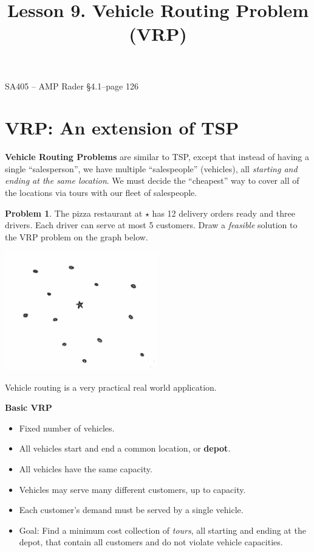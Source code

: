 \documentclass[11pt]{article}
\makeatletter
\theoremstyle{definition}
\newtheorem{problem}{Problem}
\renewcommand{\maketitle}{
  \noindent SA405 -- AMP \hfill Rader \S 4.1--page 126 \\

  \begin{center}\Large{\textbf{\@title}}\end{center}
}
\makeatother
\begin{document}
  
\title{Lesson 9.  Vehicle Routing Problem (VRP)}

\maketitle

\section{VRP:  An extension of TSP}

\textbf{Vehicle Routing Problems} are similar to TSP, except that instead of having a single ``salesperson'', we have multiple ``salespeople'' (vehicles), all \emph{starting and ending at the same location}.  We must decide the ``cheapest'' way to cover all of the locations via tours with our fleet of salespeople.

\begin{problem} The pizza restaurant at {\huge ${\star}$} has 12 delivery orders ready and three drivers.  Each driver can serve at most 5 customers.  Draw a \emph{feasible} solution to the VRP problem on the graph below.

\vspace{-.5cm}
\begin{center}
\includegraphics[width=0.5\textwidth]{pizza}
\end{center}
\end{problem}

\bigskip
\begin{tcolorbox}
Vehicle routing is a very practical real world application.
\end{tcolorbox}



\newpage

\textbf{Basic VRP}
\begin{itemize}
	\item Fixed number of vehicles.
	\item All vehicles start and end a common location, or \textbf{depot}.
	\item All vehicles have the same capacity.  
	\item Vehicles may serve many different customers, up to capacity.
	\item Each customer's demand must be served by a single vehicle.
	\item Goal:  Find a minimum cost collection of \emph{tours}, all starting and ending at the depot, that contain all customers and do not violate vehicle capacities.
\end{itemize}
\end{document}
